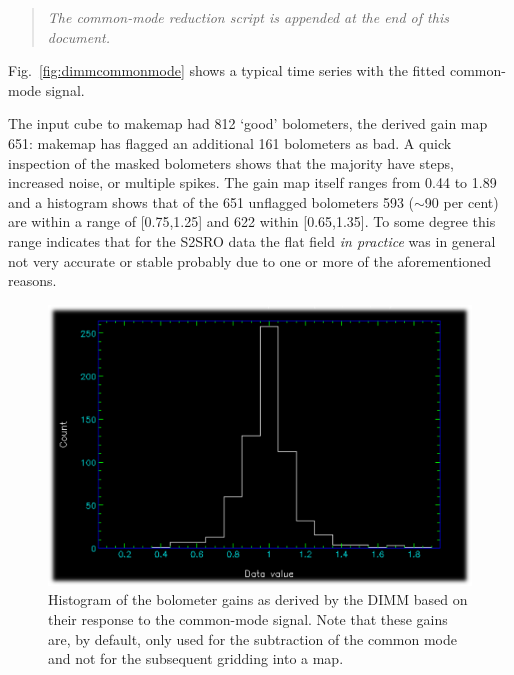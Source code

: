 \documentclass[twoside,11pt]{article}
\newcommand{\about}{$\sim$}
\renewcommand{\_}{\texttt{\symbol{95}}}
\newenvironment{myquote}{\begin{quote}\begin{small}}{\end{small}\end{quote}}
\begin{document}
\begin{myquote}
\textsl{The common-mode reduction script is appended at the end of this document.}
\end{myquote}

Fig.~\ref{fig:dimmcommonmode} shows a typical time series with the
fitted common-mode signal.

The input cube to makemap had 812 `good' bolometers, the derived gain
map 651: makemap has flagged an additional 161 bolometers as bad.  A
quick inspection of the masked bolometers shows that the majority have
steps, increased noise, or multiple spikes.  The gain map itself
ranges from 0.44 to 1.89 and a histogram shows that of the 651
unflagged bolometers 593 (\about90 per cent) are within a range of
[0.75,1.25] and 622 within [0.65,1.35]. To some degree this range
indicates that for the S2SRO data the flat field \textsl{in practice}
was in general not very accurate or stable probably due to one or more
of the aforementioned reasons.

\begin{figure}
\begin{center}
\includegraphics[width=0.45\linewidth]{sc19_gain_histogram}
\caption{Histogram of the bolometer gains as derived by the DIMM
based on their response to the common-mode signal. Note that these
gains are, by default, only used for the subtraction of the common
mode and not for the subsequent gridding into a map.}
\label{fig:gainhistogram}
\end{center}
\end{figure}
\end{document}
